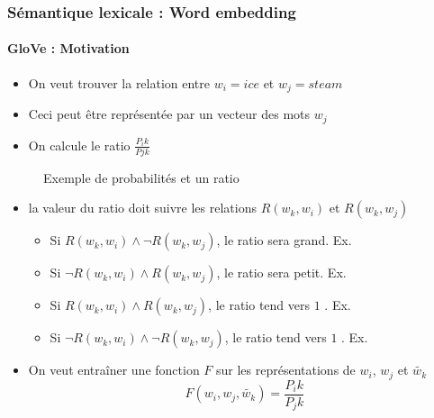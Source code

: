 \documentclass[xcolor=table]{beamer}
\begin{document}
\begin{frame}
\frametitle{Sémantique lexicale : Word embedding}
\framesubtitle{GloVe : Motivation}
	
\begin{minipage}{.5\textwidth}
	\begin{itemize}
		\item On veut trouver la relation entre $w_i = ice$ et $w_j = steam$
		\item Ceci peut être représentée par un vecteur des mots $w_j$ 
		\item On calcule le ratio $\frac{P_ik}{Pjk}$
	\end{itemize}
\end{minipage}
\begin{minipage}{.48\textwidth}
	\begin{figure}
		\caption{Exemple de probabilités et un ratio \cite{2014-pennington-al}}
	\end{figure}
\end{minipage}
	
\begin{itemize}
	\item la valeur du ratio doit suivre les relations $R(w_k, w_i)$ et $R(w_k, w_j)$
	\begin{itemize}
		\item Si $R(w_k, w_i) \wedge \neg R(w_k, w_j)$, le ratio sera grand. Ex. 
		\item Si $\neg R(w_k, w_i) \wedge R(w_k, w_j)$, le ratio sera petit. Ex. 
		\item Si $R(w_k, w_i) \wedge R(w_k, w_j)$, le ratio tend vers $1$ . Ex. 
		\item Si $\neg R(w_k, w_i) \wedge \neg R(w_k, w_j)$, le ratio tend vers $1$ . Ex. 
	\end{itemize}
	\item On veut entraîner une fonction $F$ sur les représentations de $w_i$, $w_j$ et $\tilde{w_k}$
	\vspace{-6pt}\[F(w_i, w_j, \tilde{w_k}) = \frac{P_ik}{P_jk}\]
\end{itemize}
	
\end{frame}
\end{document}
